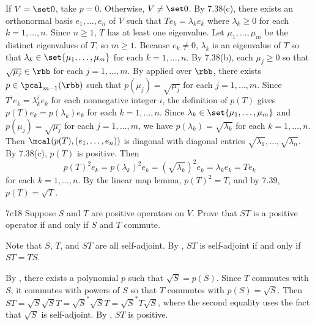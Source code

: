 \begin{sol}
    If $V = \set 0$, take $p = 0$.
    Otherwise, $V \neq \set 0$.
    By 7.38(c), there exists an orthonormal basis $e_1, \ldots, e_n$ of $V$ such that $T e_k = \lambda_k e_k$ where $\lambda_k \geq 0$ for each $k = 1, \ldots, n$.
    Since $n \geq 1$, $T$ has at least one eigenvalue.
    Let $\mu_1, \ldots, \mu_m$ be the distinct eigenvalues of $T$, so $m \geq 1$.
    Because $e_k \neq 0$, $\lambda_k$ is an eigenvalue of $T$ so that $\lambda_k \in \set{\mu_1, \ldots, \mu_m}$ for each $k = 1, \ldots, n$.
    By 7.38(b), each $\mu_j \geq 0$ so that $\sqrt{\mu_j} \in \rbb$ for each $j = 1, \ldots, m$.
    By  applied over $\rbb$, there exists $p \in \pcal_{m-1}(\rbb)$ such that $p(\mu_j) = \sqrt{\mu_j}$ for each $j = 1, \ldots, m$.
    Since $T^i e_k = \lambda_k^i e_k$ for each nonnegative integer $i$, the definition of $p(T)$ gives $p(T) e_k = p(\lambda_k) e_k$ for each $k = 1, \ldots, n$.
    Since $\lambda_k \in \set{\mu_1, \ldots, \mu_m}$ and $p(\mu_j) = \sqrt{\mu_j}$ for each $j = 1, \ldots, m$, we have $p(\lambda_k) = \sqrt{\lambda_k}$ for each $k = 1, \ldots, n$.
    Then $\mcal(p(T), (e_1, \ldots, e_n))$ is diagonal with diagonal entries $\sqrt{\lambda_1}, \ldots, \sqrt{\lambda_n}$.
    By 7.38(c), $p(T)$ is positive.
    Then
    \[
        p(T)^2 e_k = p(\lambda_k)^2 e_k = (\sqrt{\lambda_k})^2 e_k = \lambda_k e_k = T e_k
    \]
    for each $k = 1, \ldots, n$.
    By the linear map lemma, $p(T)^2 = T$, and by 7.39, $p(T) = \sqrt{T}$.
\end{sol}

\begin{exercise}{7c18}
    Suppose $S$ and $T$ are positive operators on $V$.
    Prove that $ST$ is a positive operator if and only if $S$ and $T$ commute.
\end{exercise}

\begin{soliff}
    \rightimp Note that $S$, $T$, and $ST$ are all self-adjoint.
    By , $ST$ is self-adjoint if and only if $ST = TS$.

    \leftimp By , there exists a polynomial $p$ such that $\sqrt S = p(S)$.
    Since $T$ commutes with $S$, it commutes with powers of $S$ so that $T$ commutes with $p(S) = \sqrt{S}$.
    Then $ST = \sqrt{S} \sqrt{S} T = \sqrt{S}^\ast \sqrt{S} T = \sqrt{S}^\ast T \sqrt{S}$, where the second equality uses the fact that $\sqrt{S}$ is self-adjoint.
    By , $ST$ is positive.
\end{soliff}

